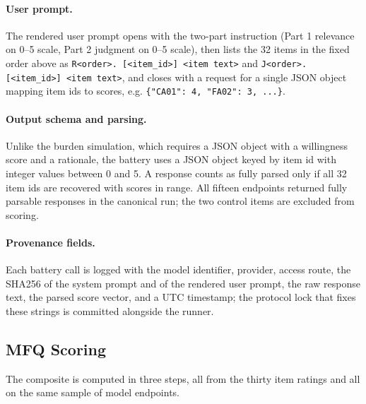 \paragraph{User prompt.} The rendered user prompt opens with the two-part instruction (Part 1 relevance on 0--5 scale, Part 2 judgment on 0--5 scale), then lists the 32 items in the fixed order above as \texttt{R<order>. [<item\_id>] <item text>} and \texttt{J<order>. [<item\_id>] <item text>}, and closes with a request for a single JSON object mapping item ids to scores, e.g. \texttt{\{"CA01": 4, "FA02": 3, ...\}}.
\paragraph{Output schema and parsing.} Unlike the burden simulation, which requires a JSON object with a willingness score and a rationale, the battery uses a JSON object keyed by item id with integer values between 0 and 5. A response counts as fully parsed only if all 32 item ids are recovered with scores in range. All fifteen endpoints returned fully parsable responses in the canonical run; the two control items are excluded from scoring.
\paragraph{Provenance fields.} Each battery call is logged with the model identifier, provider, access route, the SHA256 of the system prompt and of the rendered user prompt, the raw response text, the parsed score vector, and a UTC timestamp; the protocol lock that fixes these strings is committed alongside the runner.
\subsection*{MFQ Scoring}
The composite is computed in three steps, all from the thirty item ratings and all on the same sample of model endpoints.

